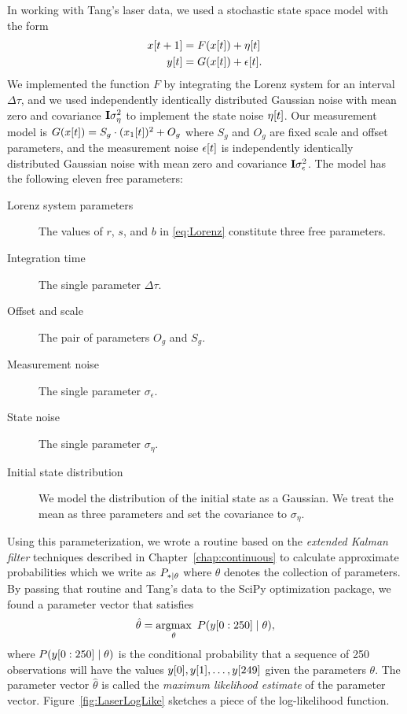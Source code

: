 In working with Tang's laser data, we used a stochastic state space
model with the form
\begin{subequations}
  \label{eq:FandG}
  \begin{align}
    {x}{[t+1]} &= F({x}{[t]}) + {\eta}{[t]}\\
    {y}{[t]}   &= G({x}{[t]}) + {\epsilon}{[t]}.
  \end{align}
\end{subequations}
We implemented the function $F$ by integrating the Lorenz system for
an interval $\Delta \tau$, and we used independently identically
distributed Gaussian noise with mean zero and covariance
${\bf I}\sigma_\eta^2$ to implement the state noise ${\eta}{[t]}$.
  Our measurement model is $G({x}{[t]}) = S_g \cdot
({x_1}{[t]})^2 + O_g$ where $S_g$ and $O_g$ are fixed scale and
offset parameters, and the measurement noise ${\epsilon}{[t]}$ is
independently identically distributed Gaussian noise with mean zero
and covariance ${\bf I}\sigma_\epsilon^2$.  The model has the following
eleven free parameters:
\begin{description}
\item[Lorenz system parameters] The values of $r$, $s$, and $b$ in
  \eqref{eq:Lorenz} constitute three free parameters.
\item[Integration time] The single parameter $\Delta \tau$.
\item[Offset and scale] The pair of parameters $O_g$ and $S_g$.
\item[Measurement noise] The single parameter $\sigma_\epsilon$.
\item[State noise] The single parameter $\sigma_\eta$.
\item[Initial state distribution] We model the distribution of the
  initial state as a Gaussian.  We treat the mean as three
  parameters and set the covariance to $\sigma_\eta$.
\end{description}

Using this parameterization, we wrote a routine based on the
\emph{extended Kalman filter} %
%
%
techniques described in Chapter~\ref{chap:continuous} to calculate
approximate probabilities which we write as $P_{*\mid \theta}$ where
$\theta$ denotes the collection of parameters.  By passing that
routine and Tang's data to the SciPy optimization package, we found a
parameter vector that satisfies
\begin{equation}
  \label{eq:theta-hat-laser}
  \hat \theta = \operatorname*{argmax}_{\theta} ~ P(y[0:250]\mid \theta),
\end{equation}
where $P(y[0:250]\mid \theta)$ is the conditional probability that a
sequence of 250 observations will have the values
${y}{[0]},{y}{[1]}, \ldots,{y}{[249]}$ given the parameters
$\theta$.  The parameter vector $\hat \theta$ is called the
\emph{maximum likelihood estimate} %
%
%
of the parameter vector.  Figure~\ref{fig:LaserLogLike} sketches a
piece of the log-likelihood function.

